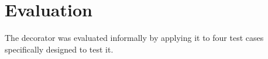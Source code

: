 \section{Evaluation}\label{sec:evaluation}

The decorator was evaluated informally by applying it to four test cases
specifically designed to test it.
%

